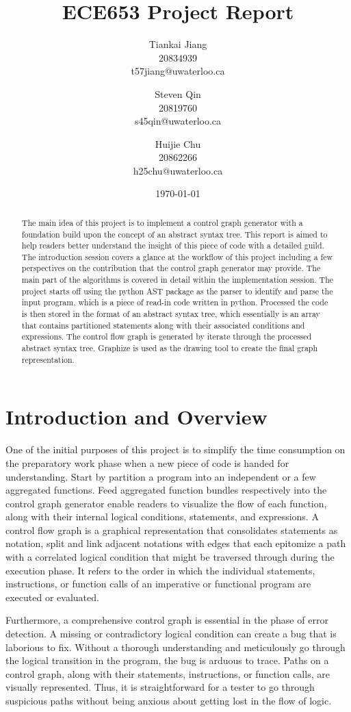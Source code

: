 \documentclass[11pt]{article}
\title{ECE653 Project Report}
\author{Tiankai Jiang\\20834939\\t57jiang@uwaterloo.ca \and Steven Qin\\20819760\\s45qin@uwaterloo.ca \and Huijie Chu\\20862266\\h25chu@uwaterloo.ca}
\date{\today}
\begin{document}
\maketitle

\begin{abstract}
The main idea of this project is to implement a control graph generator with a foundation build upon the concept of an abstract syntax tree. This report is aimed to help readers better understand the insight of this piece of code with a detailed guild. The introduction session covers a glance at the workflow of this project including a few perspectives on the contribution that the control graph generator may provide. The main part of the algorithms is covered in detail within the implementation session. The project starts off using the python AST package as the parser to identify and parse the input program, which is a piece of read-in code written in python. Processed the code is then stored in the format of an abstract syntax tree, which essentially is an array that contains partitioned statements along with their associated conditions and expressions. The control flow graph is generated by iterate through the processed abstract syntax tree. Graphize is used as the drawing tool to create the final graph representation.
\end{abstract}

\section{Introduction and Overview}\label{section-introduction}
One of the initial purposes of this project is to simplify the time consumption on the preparatory work phase when a new piece of code is handed for understanding. Start by partition a program into an independent or a few aggregated functions. Feed aggregated function bundles respectively into the control graph generator enable readers to visualize the flow of each function, along with their internal logical conditions, statements, and expressions. A control flow graph is a graphical representation that consolidates statements as notation, split and link adjacent notations with edges that each epitomize a path with a correlated logical condition that might be traversed through during the execution phase. It refers to the order in which the individual statements, instructions, or function calls of an imperative or functional program are executed or evaluated.

Furthermore, a comprehensive control graph is essential in the phase of error detection. A missing or contradictory logical condition can create a bug that is laborious to fix. Without a thorough understanding and meticulously go through the logical transition in the program, the bug is arduous to trace. Paths on a control graph, along with their statements, instructions, or function calls, are visually represented. Thus, it is straightforward for a tester to go through suspicious paths without being anxious about getting lost in the flow of logic.
\end{document}
